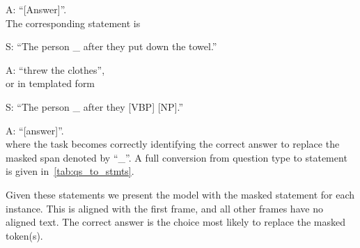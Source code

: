 A: ``[Answer]''.\\
The corresponding statement is

S: ``The person \_ after they put down the towel.''

A: ``threw the clothes'',\\
or in templated form

S: ``The person \_ after they [VBP] [NP].''

A: ``[answer]''.\\
where the task becomes correctly identifying the correct answer to replace the
masked span denoted by ``\_''. A full conversion from question type to
statement is given in~\cref{tab:qs_to_stmts}.

Given these statements we present the model with the masked statement for each
instance. This is aligned with the first frame, and all other frames have no
aligned text. The correct answer is the choice most likely to replace the
masked token(s).

